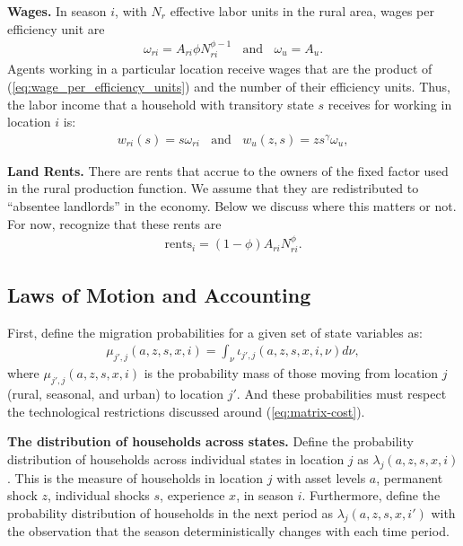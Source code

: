 \documentclass[12pt,pdftex]{article}
\begin{document}
\begin{onehalfspacing}
\textbf{Wages.} In season $i$, with $N_r$ effective labor units in the rural area, wages per efficiency unit are
\begin{align}
\omega_{ri} = A_{ri} \phi N_{ri}^{\phi-1}  \ \ \ \  \mbox{and} \ \ \ \ \omega_u = A_u.
\label{eq:wage_per_efficiency_units}
\end{align}
Agents working in a particular location receive wages that are the product of (\ref{eq:wage_per_efficiency_units}) and the number of their efficiency units. Thus, the labor income that a household  with transitory state $s$ receives for working in location $i$ is:
\begin{align}
w_{ri}(s) = s \omega_{ri} \ \ \ \ \mbox{and} \ \ \ \ w_{u}(z,s) = z s^{\gamma} \omega_u,
\label{eq:wages}
\end{align}

\textbf{Land Rents.} There are rents that accrue to the owners of the fixed factor used in the rural production function. We assume that they are redistributed to ``absentee landlords'' in the economy. Below we discuss where this matters or not. For now, recognize that these rents are
\begin{align}
\mbox{rents}_{i} = (1-\phi) A_{ri} N_{ri}^{\phi}.
\label{eq:rents}
\end{align}


\subsection{Laws of Motion and Accounting}

First, define the migration probabilities for a given set of state variables as:
\begin{align}
\mu_{j',j}(a, z, s,  x, i) = \int_{\nu} \iota_{j',j}(a, z, s, x, i, \nu) d\nu,
\end{align}
where $\mu_{j',j}(a, z, s, x, i)$ is the probability mass of those moving from location $j$ (rural, seasonal, and urban) to location $j'$. And these probabilities must respect the technological restrictions discussed around (\ref{eq:matrix-cost}).

\textbf{The distribution of households across states.} Define the probability distribution of households across individual states in location $j$ as $\lambda_{j}(a, z, s, x, i)$. This is the measure of households in location $j$ with asset levels $a$, permanent shock $z$, individual shocks $s$, experience $x$, in season $i$. Furthermore, define the probability distribution of households in the next period as $\lambda_{j}(a, z, s, x, i')$ with the observation that the season deterministically changes with each time period.


\end{onehalfspacing}
\end{document}
